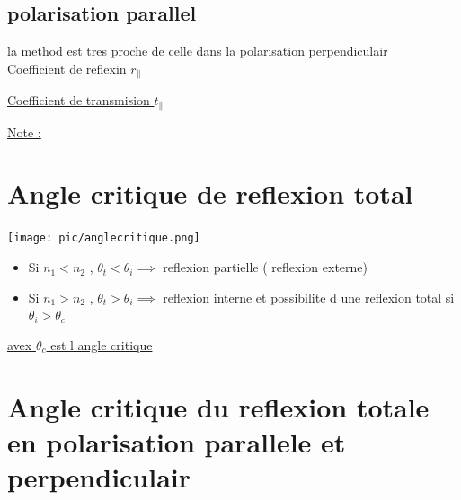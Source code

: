 \documentclass[12pt]{book}
\begin{document}
            \subsection{polarisation parallel}
                la method est tres proche de celle dans la polarisation perpendiculair \\
                \underline{Coefficient de reflexin $r_\parallel$}
                \begin{center}
                \end{center}
                \underline{Coefficient de transmision $t_\parallel$}
                \begin{center}
                \end{center}
                \underline{Note :} \\
                \begin{center}
                \end{center}
                \pagebreak
        \section{Angle critique de reflexion total}
            \texttt{[image: pic/anglecritique.png]}
            \begin{itemize}
                \item Si $n_1 < n_2$ , $\theta_t < \theta_i \implies $ reflexion partielle ( reflexion externe)
                \item Si $n_1 > n_2$ , $\theta_t > \theta_i \implies $ reflexion interne et possibilite d une reflexion total si $\theta_i > \theta_c$
            \end{itemize}
            \underline{avex $\theta_c$ est l angle critique}
        \section{Angle critique du reflexion totale en polarisation parallele et perpendiculair}
\end{document}
